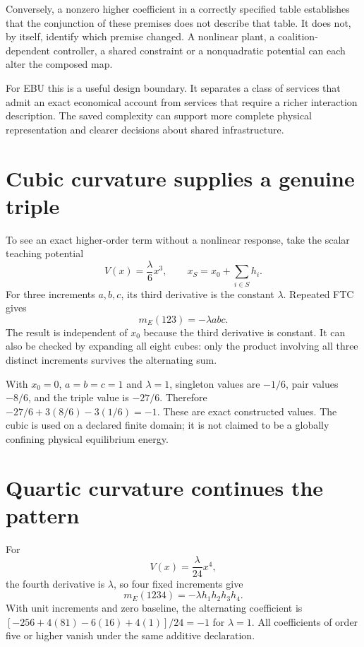 Conversely, a nonzero higher coefficient in a correctly specified table establishes that the conjunction of these premises does not describe that table. It does not, by itself, identify which premise changed. A nonlinear plant, a coalition-dependent controller, a shared constraint or a nonquadratic potential can each alter the composed map.

For EBU this is a useful design boundary. It separates a class of services that admit an exact economical account from services that require a richer interaction description. The saved complexity can support more complete physical representation and clearer decisions about shared infrastructure.

\section{Cubic curvature supplies a genuine triple}
To see an exact higher-order term without a nonlinear response, take the scalar teaching potential
\begin{equation}
 V(x)=\frac{\lambda}{6}x^3,
 \qquad x_S=x_0+\sum_{i\in S}h_i.
\end{equation}
For three increments $a,b,c$, its third derivative is the constant $\lambda$. Repeated FTC gives
\begin{equation}\label{eq:cubic-example}
 m_E(123)=-\lambda abc.
\end{equation}
The result is independent of $x_0$ because the third derivative is constant. It can also be checked by expanding all eight cubes: only the product involving all three distinct increments survives the alternating sum.

With $x_0=0$, $a=b=c=1$ and $\lambda=1$, singleton values are $-1/6$, pair values $-8/6$, and the triple value is $-27/6$. Therefore $-27/6+3(8/6)-3(1/6)=-1$. These are exact constructed values. The cubic is used on a declared finite domain; it is not claimed to be a globally confining physical equilibrium energy.

\section{Quartic curvature continues the pattern}
For
\begin{equation}
 V(x)=\frac{\lambda}{24}x^4,
\end{equation}
the fourth derivative is $\lambda$, so four fixed increments give
\begin{equation}\label{eq:quartic-example}
 m_E(1234)=-\lambda h_1h_2h_3h_4.
\end{equation}
With unit increments and zero baseline, the alternating coefficient is
$[-256+4(81)-6(16)+4(1)]/24=-1$ for $\lambda=1$. All coefficients of order five or higher vanish under the same additive declaration.

